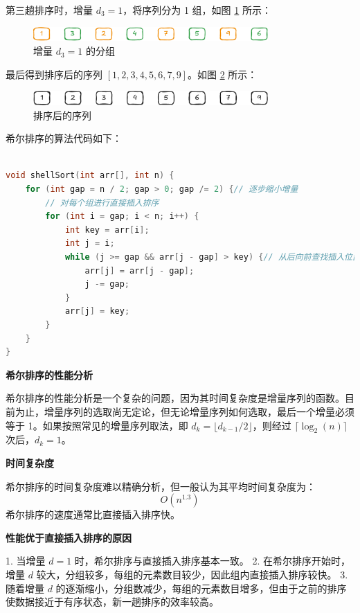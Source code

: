 \documentclass[lang=cn,newtx,10pt,scheme=chinese]{../elegantbook}
\begin{document}
第三趟排序时，增量 $d_3 = 1$，将序列分为 1 组，如图 \ref{fig:shellSort3} 所示：
\begin{figure}[!htbp]
    \centering
    \includegraphics[width=0.8\textwidth]{./figure/pdf/cropped/shell(c).pdf}
    \caption{增量 $d_3 = 1$ 的分组}
    \label{fig:shellSort3}
\end{figure}

最后得到排序后的序列 $[1,2,3,4,5,6,7,9]$。如图 \ref{fig:shellSort4} 所示：
\begin{figure}[!htbp]
    \centering
    \includegraphics[width=0.8\textwidth]{./figure/pdf/cropped/shell(d).pdf}
    \caption{排序后的序列}
    \label{fig:shellSort4}
\end{figure}

希尔排序的算法代码如下：
\begin{lstlisting}[language=C++, caption=希尔排序的算法代码]

void shellSort(int arr[], int n) {
    for (int gap = n / 2; gap > 0; gap /= 2) {// 逐步缩小增量
        // 对每个组进行直接插入排序
        for (int i = gap; i < n; i++) {
            int key = arr[i];
            int j = i;
            while (j >= gap && arr[j - gap] > key) {// 从后向前查找插入位置
                arr[j] = arr[j - gap];
                j -= gap;
            }
            arr[j] = key;
        }
    }
}

\end{lstlisting}

\textbf{希尔排序的性能分析}

希尔排序的性能分析是一个复杂的问题，因为其时间复杂度是增量序列的函数。目前为止，增量序列的选取尚无定论，但无论增量序列如何选取，最后一个增量必须等于 1。如果按照常见的增量序列取法，即 $d_k = \lfloor d_{k-1} / 2 \rfloor$，则经过 $\lceil \log_2(n) \rceil$ 次后，$d_k = 1$。


\textbf{时间复杂度}  

希尔排序的时间复杂度难以精确分析，但一般认为其平均时间复杂度为：
\[
O(n^{1.3})
\]
希尔排序的速度通常比直接插入排序快。


\textbf{性能优于直接插入排序的原因}

1. 当增量 $d = 1$ 时，希尔排序与直接插入排序基本一致。
2. 在希尔排序开始时，增量 $d$ 较大，分组较多，每组的元素数目较少，因此组内直接插入排序较快。
3. 随着增量 $d$ 的逐渐缩小，分组数减少，每组的元素数目增多，但由于之前的排序使数据接近于有序状态，新一趟排序的效率较高。
\end{document}
